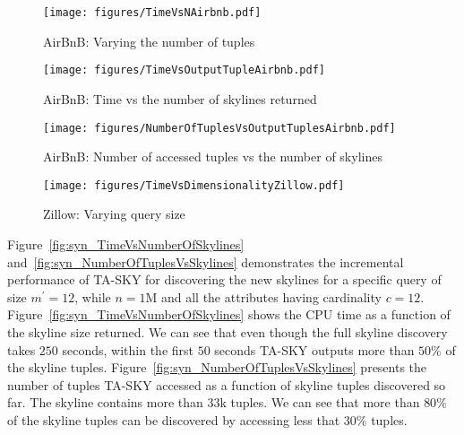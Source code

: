 \begin{figure*}[!ht]
  \vspace{-6mm}
  \begin{minipage}[t]{0.23\linewidth}
    \centering
    \texttt{[image: figures/TimeVsNAirbnb.pdf]}
    \caption{AirBnB: Varying the number of tuples}
    \label{fig:Airbnbn}    
  \end{minipage}
  \begin{minipage}[t]{0.23\linewidth}
    \centering
    \texttt{[image: figures/TimeVsOutputTupleAirbnb.pdf]}
    \caption{AirBnB: Time vs the number of skylines returned} 
    \label{fig:Airbnbp1}
  \end{minipage}
  \hspace{1mm}
  \begin{minipage}[t]{0.25\linewidth}
    \centering
    \texttt{[image: figures/NumberOfTuplesVsOutputTuplesAirbnb.pdf]}
    \caption{AirBnB: Number of accessed tuples vs the number of skylines}
    \label{fig:Airbnbp2}
  \end{minipage}
  \begin{minipage}[t]{0.25\linewidth}
    \centering
    \texttt{[image: figures/TimeVsDimensionalityZillow.pdf]}
    \caption{Zillow: Varying query size}
    \label{fig:Zillowm}
  \end{minipage}
\end{figure*}

\vspace{1mm}
 Figure~\ref{fig:syn_TimeVsNumberOfSkylines} and~\ref{fig:syn_NumberOfTuplesVsSkylines} demonstrates the incremental performance of TA-SKY for discovering the new skylines for a specific query of size $m^\prime=12$, while $n=1$M and all the attributes having cardinality $c=12$. Figure~\ref{fig:syn_TimeVsNumberOfSkylines} shows the CPU time as a function of the skyline size returned. We can see that even though the full skyline discovery takes $250$ seconds, within the first $50$ seconds TA-SKY outputs more than $50\%$  of the skyline tuples. Figure~\ref{fig:syn_NumberOfTuplesVsSkylines} presents the number of tuples TA-SKY accessed as a function of skyline tuples discovered so far. The skyline contains more than $33$k tuples. We can see that more than $80$\% of the skyline tuples can be discovered by accessing less that $30$\% tuples.


